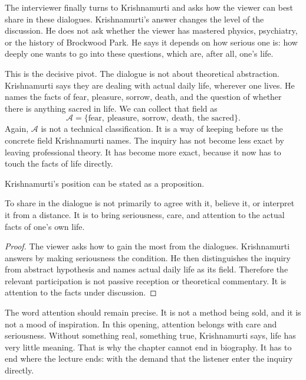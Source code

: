 The interviewer finally turns to Krishnamurti and asks how the viewer can best share in these dialogues. Krishnamurti's answer changes the level of the discussion. He does not ask whether the viewer has mastered physics, psychiatry, or the history of Brockwood Park. He says it depends on how serious one is: how deeply one wants to go into these questions, which are, after all, one's life.

This is the decisive pivot. The dialogue is not about theoretical abstraction. Krishnamurti says they are dealing with actual daily life, wherever one lives. He names the facts of fear, pleasure, sorrow, death, and the question of whether there is anything sacred in life. We can collect that field as
\begin{equation}
\mathcal{A}
=
\{\text{fear},\ \text{pleasure},\ \text{sorrow},\ \text{death},\ \text{the sacred}\}.
\end{equation}
Again, \(\mathcal{A}\) is not a technical classification. It is a way of keeping before us the concrete field Krishnamurti names. The inquiry has not become less exact by leaving professional theory. It has become more exact, because it now has to touch the facts of life directly.

Krishnamurti's position can be stated as a proposition.

\begin{proposition}
To share in the dialogue is not primarily to agree with it, believe it, or interpret it from a distance. It is to bring seriousness, care, and attention to the actual facts of one's own life.
\end{proposition}

\begin{proof}
The viewer asks how to gain the most from the dialogues. Krishnamurti answers by making seriousness the condition. He then distinguishes the inquiry from abstract hypothesis and names actual daily life as its field. Therefore the relevant participation is not passive reception or theoretical commentary. It is attention to the facts under discussion.
\end{proof}

The word attention should remain precise. It is not a method being sold, and it is not a mood of inspiration. In this opening, attention belongs with care and seriousness. Without something real, something true, Krishnamurti says, life has very little meaning. That is why the chapter cannot end in biography. It has to end where the lecture ends: with the demand that the listener enter the inquiry directly.

